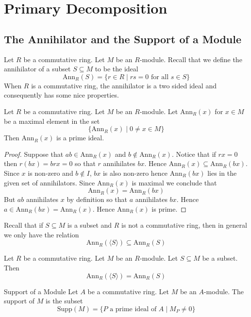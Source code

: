 \documentclass[a4paper]{article}
\begin{document}
\pagebreak
\section{Primary Decomposition}
\subsection{The Annihilator and the Support of a Module}
Let $R$ be a commutative ring. Let $M$ be an $R$-module. Recall that we define the annihilator of a subset $S\subseteq M$ to be the ideal $$\text{Ann}_R(S)=\{r\in R\;|\;rs=0\text{ for all }s\in S\}$$ When $R$ is a commutative ring, the annihilator is a two sided ideal and consequently has some nice properties. 

\begin{prp}{}{} Let $R$ be a commutative ring. Let $M$ be an $R$-module. Let $\text{Ann}_R(x)$ for $x\in M$ be a maximal element in the set $$\{\text{Ann}_R(x)\;|\;0\neq x\in M\}$$ Then $\text{Ann}_R(x)$ is a prime ideal. \tcbline
\begin{proof}
Suppose that $ab\in\text{Ann}_R(x)$ and $b\notin\text{Ann}_R(x)$. Notice that if $rx=0$ then $r(bx)=brx=0$ so that $r$ annihilates $bx$. Hence $\text{Ann}_R(x)\subseteq\text{Ann}_R(bx)$. Since $x$ is non-zero and $b\notin I$, $bx$ is also non-zero hence $\text{Ann}_R(bx)$ lies in the given set of annihilators. Since $\text{Ann}_R(x)$ is maximal we conclude that $$\text{Ann}_R(x)=\text{Ann}_R(bx)$$ But $ab$ annihilates $x$ by definition so that $a$ annihilates $bx$. Hence $a\in\text{Ann}_R(bx)=\text{Ann}_R(x)$. Hence $\text{Ann}_R(x)$ is prime. 
\end{proof}
\end{prp}

Recall that if $S\subseteq M$ is a subset and $R$ is not a commutative ring, then in general we only have the relation $$\text{Ann}_R(\langle S\rangle)\subseteq\text{Ann}_R(S)$$

\begin{prp}{}{} Let $R$ be a commutative ring. Let $M$ be an $R$-module. Let $S\subseteq M$ be a subset. Then $$\text{Ann}_R(\langle S\rangle)=\text{Ann}_R(S)$$
\end{prp}

\begin{defn}{Support of a Module}{} Let $A$ be a commutative ring. Let $M$ be an $A$-module. The support of $M$ is the subset $$\text{Supp}(M)=\{P\text{ a prime ideal of }A\;|\;M_P\neq 0\}$$
\end{defn}
\end{document}
